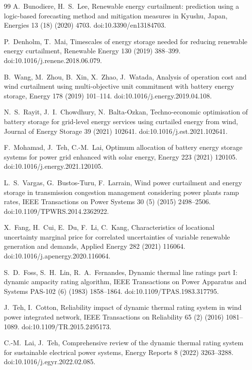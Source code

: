 \documentclass[preprint,3p,times]{elsarticle}
\begin{document}
\begin{thebibliography}{99}
A.~Bunodiere, H.~S.~Lee,
Renewable energy curtailment: prediction using a logic-based forecasting method and mitigation measures in Kyushu, Japan,
Energies 13 (18) (2020) 4703.
doi:10.3390/en13184703.

P.~Denholm, T.~Mai,
Timescales of energy storage needed for reducing renewable energy curtailment,
Renewable Energy 130 (2019) 388--399.
doi:10.1016/j.renene.2018.06.079.

B.~Wang, M.~Zhou, B.~Xin, X.~Zhao, J.~Watada,
Analysis of operation cost and wind curtailment using multi-objective unit commitment with battery energy storage,
Energy 178 (2019) 101--114.
doi:10.1016/j.energy.2019.04.108.

N.~S.~Rayit, J.~I.~Chowdhury, N.~Balta-Ozkan,
Techno-economic optimisation of battery storage for grid-level energy services using curtailed energy from wind,
Journal of Energy Storage 39 (2021) 102641.
doi:10.1016/j.est.2021.102641.

F.~Mohamad, J.~Teh, C.-M.~Lai,
Optimum allocation of battery energy storage systems for power grid enhanced with solar energy,
Energy 223 (2021) 120105.
doi:10.1016/j.energy.2021.120105.

L.~S.~Vargas, G.~Bustos-Turu, F.~Larrain,
Wind power curtailment and energy storage in transmission congestion management considering power plants ramp rates,
IEEE Transactions on Power Systems 30 (5) (2015) 2498--2506.
doi:10.1109/TPWRS.2014.2362922.

X.~Fang, H.~Cui, E.~Du, F.~Li, C.~Kang,
Characteristics of locational uncertainty marginal price for correlated uncertainties of variable renewable generation and demands,
Applied Energy 282 (2021) 116064.
doi:10.1016/j.apenergy.2020.116064.

S.~D.~Foss, S.~H.~Lin, R.~A.~Fernandes,
Dynamic thermal line ratings part I: dynamic ampacity rating algorithm,
IEEE Transactions on Power Apparatus and Systems PAS-102 (6) (1983) 1858--1864.
doi:10.1109/TPAS.1983.317795.

J.~Teh, I.~Cotton,
Reliability impact of dynamic thermal rating system in wind power integrated network,
IEEE Transactions on Reliability 65 (2) (2016) 1081--1089.
doi:10.1109/TR.2015.2495173.

C.-M.~Lai, J.~Teh,
Comprehensive review of the dynamic thermal rating system for sustainable electrical power systems,
Energy Reports 8 (2022) 3263--3288.
doi:10.1016/j.egyr.2022.02.085.


\end{thebibliography}
\end{document}
